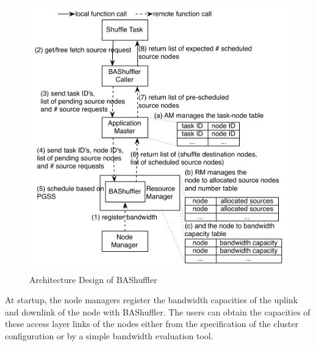 \documentclass[10pt,journal,compsoc]{IEEEtran}
\begin{document}
\begin{figure}
\centering

\includegraphics[width=1\columnwidth]{figure1}

\caption{Architecture Design of BAShuffler}
\label{fig:bashuffler}
\end{figure}

At startup, the node managers register the bandwidth capacities of the uplink
and downlink of the node with BAShuffler. The users can obtain the
capacities of these access layer links of the nodes either from the
specification of the cluster configuration or by a simple bandwidth
evaluation tool.
\end{document}
